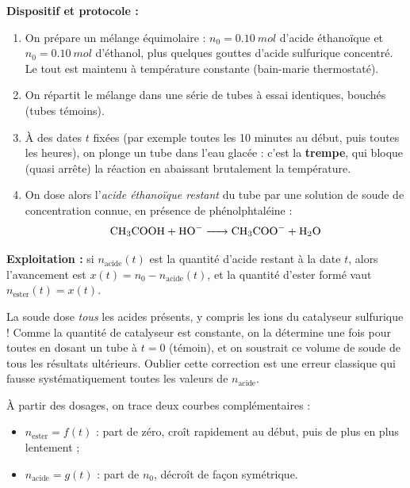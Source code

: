 \documentclass[11pt]{article}
\newcommand{\cle}[1]{{\popxbold\color{popdark}#1}}
\newcounter{popsec}
\newcounter{popsub}
\newcommand{\courssub}[1]{%
  \stepcounter{popsub}%
  \par\vspace{9pt}\noindent{\popxbold\fontsize{11.5}{13}\selectfont\color{popink}{\color{poporange}\thepopsec.\thepopsub}\hspace{6pt}#1}\par\nopagebreak\vspace{4pt}
}
\begin{document}
\begin{experience}
\textbf{Dispositif et protocole :}
\begin{enumerate}
\item On prépare un mélange \cle{équimolaire} : $n_0 = \SI{0,10}{mol}$ d'acide éthanoïque et $n_0 = \SI{0,10}{mol}$ d'éthanol, plus quelques gouttes d'acide sulfurique concentré. Le tout est maintenu à température constante (bain-marie thermostaté).
\item On répartit le mélange dans une série de tubes à essai identiques, bouchés (tubes témoins).
\item À des dates $t$ fixées (par exemple toutes les 10 minutes au début, puis toutes les heures), on plonge un tube dans l'eau glacée : c'est la \textbf{trempe}, qui bloque (quasi arrête) la réaction en abaissant brutalement la température.
\item On dose alors l'\emph{acide éthanoïque restant} du tube par une solution de soude de concentration connue, en présence de phénolphtaléine :
\[ \ce{CH3COOH + HO- -> CH3COO- + H2O} \]
\end{enumerate}
\textbf{Exploitation :} si $n_{\text{acide}}(t)$ est la quantité d'acide restant à la date $t$, alors l'avancement est $x(t) = n_0 - n_{\text{acide}}(t)$, et la quantité d'ester formé vaut $n_{\text{ester}}(t) = x(t)$.
\end{experience}

\begin{attention}
La soude dose \emph{tous} les acides présents, y compris les ions  du catalyseur sulfurique ! Comme la quantité de catalyseur est constante, on la détermine une fois pour toutes en dosant un tube à $t = 0$ (témoin), et on soustrait ce volume de soude de tous les résultats ultérieurs. Oublier cette correction est une erreur classique qui fausse systématiquement toutes les valeurs de $n_{\text{acide}}$.
\end{attention}

\courssub{Tracé et lecture des courbes}

À partir des dosages, on trace deux courbes complémentaires :

\begin{itemize}
\item $n_{\text{ester}} = f(t)$ : part de zéro, croît rapidement au début, puis de plus en plus lentement ;
\item $n_{\text{acide}} = g(t)$ : part de $n_0$, décroît de façon symétrique.
\end{itemize}
\end{document}
